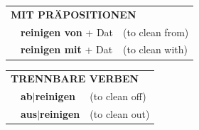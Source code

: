 \documentclass[10pt,a4paper]{revtex4-2}
\begin{document}
\begin{verbbox}
\vspace{10pt}

\begin{tabular}{lll}
\multicolumn{3}{l}{\textbf{MIT PRÄPOSITIONEN}}\\
& \textbf{reinigen von} + Dat & (to clean from)\\
& \textbf{reinigen mit} + Dat & (to clean with)\\
\end{tabular}
\hfill
\begin{tabular}{lll}
\multicolumn{3}{l}{\textbf{TRENNBARE VERBEN}}\\
& \textbf{ab$|$reinigen} & (to clean off)\\
& \textbf{aus$|$reinigen} & (to clean out)\\
\end{tabular}
\vspace{-5pt}
\end{verbbox}
\end{document}
